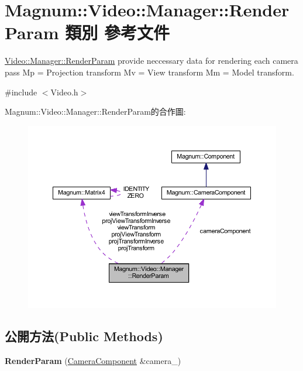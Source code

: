 \hypertarget{class_magnum_1_1_video_1_1_manager_1_1_render_param}{}\section{Magnum\+:\+:Video\+:\+:Manager\+:\+:Render\+Param 類別 參考文件}
\label{class_magnum_1_1_video_1_1_manager_1_1_render_param}


\hyperlink{class_magnum_1_1_video_1_1_manager_1_1_render_param}{Video\+::\+Manager\+::\+Render\+Param} provide neccessary data for rendering each camera pass Mp = Projection transform Mv = View transform Mm = Model transform.  




{\ttfamily \#include $<$Video.\+h$>$}



Magnum\+:\+:Video\+:\+:Manager\+:\+:Render\+Param的合作圖\+:\nopagebreak
\begin{figure}[H]
\begin{center}
\leavevmode
\includegraphics[width=350pt]{class_magnum_1_1_video_1_1_manager_1_1_render_param__coll__graph}
\end{center}
\end{figure}
\subsection*{公開方法(Public Methods)}
\begin{DoxyCompactItemize}
\item 
{\bfseries Render\+Param} (\hyperlink{class_magnum_1_1_camera_component}{Camera\+Component} \&camera\+\_\+)\hypertarget{class_magnum_1_1_video_1_1_manager_1_1_render_param_a1f521ca736e476b4c560f6d834e38a35}{}\label{class_magnum_1_1_video_1_1_manager_1_1_render_param_a1f521ca736e476b4c560f6d834e38a35}

\end{DoxyCompactItemize}
